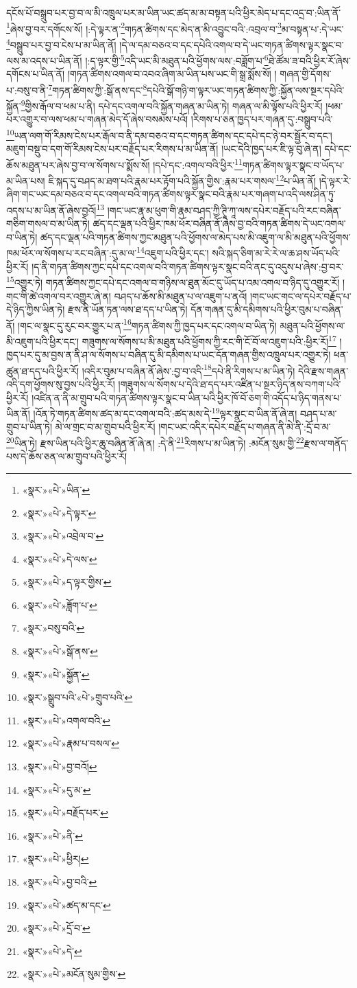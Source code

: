 དངོས་པོ་བསྒྲུབ་པར་བྱ་བ་ལ་མི་འཁྲུལ་པར་མ་ཡིན་ཡང་ཚད་མ་མ་བསྟན་པའི་ཕྱིར་མེད་པ་དང་འདྲ་བ་:ཡིན་ནོ་\footnote{«སྣར་»«པེ་»ཡིན་}ཞེས་བྱ་བར་དགོངས་སོ། །:དེ་ལྟར་ན་\footnote{«སྣར་»«པེ་»དེ་ལྟར་}གཏན་ཚིགས་དང་མེད་ན་མི་འབྱུང་བའི་:འབྲལ་བ་\footnote{«སྣར་»«པེ་»འབྲེལ་བ་}མ་བསྟན་པ་:དེ་ཡང་\footnote{«སྣར་»«པེ་»དེ་ལས་}བསྒྲུབ་པར་བྱ་བ་ངེས་པ་མ་ཡིན་ནོ། །དེ་ལ་དམ་བཅའ་བ་དང་དཔེའི་འགལ་བ་དེ་ཡང་གཏན་ཚིགས་ལྟར་སྣང་བ་ལས་མ་འདས་པ་ཡིན་ནོ། །:ད་ལྟར་གྱི་\footnote{«སྣར་»«པེ་»ད་ལྟར་གྱིས་}འདི་ཡང་མི་མཐུན་པའི་ཕྱོགས་ལས་:བཟློག་པ་\footnote{«སྣར་»«པེ་»ཟློག་པ་}ཐེ་ཚོམ་ཟ་བའི་ཕྱིར་རོ་ཞེས་དགོངས་པ་ཡིན་ནོ། །གཏན་ཚིགས་འགལ་བ་འབའ་ཞིག་མ་ཡིན་པས་ཡང་གི་སྒྲ་སྨོས་སོ། །
གཞན་གྱི་དོགས་པ་:བསུ་བ་ནི་\footnote{«སྣར་»བསུ་བའི་}གཏན་ཚིགས་ཀྱི་:སྒོ་ནས་དང་\footnote{«སྣར་»«པེ་»སྒོ་ནས་}དཔེའི་སྒོ་གཉི་ག་ལྟར་ཡང་གཏན་ཚིགས་ཀྱི་:སྐྱོན་ལས་སྔར་དཔེའི་སྐྱོན་\footnote{«སྣར་»«པེ་»སྐྱོན་}གྱིས་རྒོལ་བ་ཕམ་པ་ནི། དཔེ་དང་འགལ་བའི་སྐྱོན་གཞན་མ་ཡིན་ཏེ། གཞན་ལ་མི་ལྟོས་པའི་ཕྱིར་རོ། །ཕམ་པར་འགྱུར་བ་ལས་ཕམ་པ་གཞན་མེད་དོ་ཞེས་བསམས་པའོ། །རིགས་པ་ཅན་ཁྱད་པར་གཞན་དུ་:བསྒྲུབ་པའི་\footnote{«སྣར་»སྒྲུབ་པའི་«པེ་»གྲུབ་པའི་}ཡན་ལག་གོ་རིམས་ངེས་པར་རྒོལ་བ་ནི་དམ་བཅའ་བ་དང་གཏན་ཚིགས་དང་དཔེ་དང་ཉེ་བར་སྦྱོར་བ་དང་། མཇུག་བསྡུ་བ་དག་གོ་རིམས་ངེས་པར་བརྗོད་པར་རིགས་པ་མ་ཡིན་ནོ། །ཡང་དེའི་ཁྱད་པར་ཇི་ལྟ་བུ་ཞེ་ན། དཔེ་དང་ཆོས་མཐུན་པར་ཞེས་བྱ་བ་ལ་སོགས་པ་སྨོས་སོ། །དཔེ་དང་:འགལ་བའི་ཕྱིར་\footnote{«སྣར་»«པེ་»འགལ་བའི་}གཏན་ཚིགས་ལྟར་སྣང་བ་ཡོད་པ་མ་ཡིན་པས། ཇི་སྐད་དུ་བཤད་མ་ཐག་པའི་རྣམ་པར་རྟོག་པའི་སྐྱོན་གྱིས་:རྣམ་པར་གསལ་\footnote{«སྣར་»«པེ་»རྣམ་པ་བསལ་}པ་ཡིན་ནོ། །དེ་ལྟར་རེ་ཞིག་གང་ཡང་དམ་བཅའ་བ་དང་འགལ་བའི་གཏན་ཚིགས་ལྟར་སྣང་བའི་རྣམ་པར་གཞག་པ་འདི་ལས་ཤིན་ཏུ་འདས་པ་མ་ཡིན་ནོ་ཞེས་བྱའོ།\footnote{«སྣར་»«པེ་»བྱ་བའོ།} །གང་ཡང་རྣ་མ་ཕུག་གི་རྣམ་བཤད་ཀྱི་ཊཱི་ཀཱ་ལས་དཔེར་བརྗོད་པའི་རང་བཞིན་གཅིག་གསལ་བ་མ་ཡིན་ཏེ། ཚད་དང་ལྡན་པའི་ཕྱིར་ཁམ་ཕོར་བཞིན་ནོ་ཞེས་བྱ་བའི་གཏན་ཚིགས་དེ་ཡང་འགལ་བ་ཡིན་ཏེ། ཚད་དང་ལྡན་པའི་གཏན་ཚིགས་ཀྱང་མཐུན་པའི་ཕྱོགས་ལ་མེད་པས་མི་འཇུག་ལ་མི་མཐུན་པའི་ཕྱོགས་ཁམ་ཕོར་ལ་སོགས་པ་རང་བཞིན་:དུ་མ་ལ་\footnote{«སྣར་»«པེ་»དུ་མ་}འཇུག་པའི་ཕྱིར་དང་། སའི་སྐད་ཅིག་མ་རེ་རེ་ལ་ཆ་ཤས་ཡོད་པའི་ཕྱིར་རོ། །ད་ནི་གཏན་ཚིགས་ཀྱང་དཔེ་དང་འགལ་བའི་གཏན་ཚིགས་ལྟར་སྣང་བའི་ནང་དུ་འདུས་པ་ཞེས་:བྱ་བར་\footnote{«སྣར་»«པེ་»བརྗོད་པར་}འགྱུར་ཏེ། གཏན་ཚིགས་ཀྱང་དཔེ་དང་འགལ་བ་གཉིས་ལ་ཐུན་མོང་དུ་ཡོད་པ་འམ་འགལ་བ་ཉིད་དུ་འགྱུར་རོ། །གང་གི་ཚེ་འགལ་བར་འགྱུར་ཞེ་ན། བཤད་པ་ཆོས་མི་མཐུན་པ་ལ་འཇུག་པ་ནའོ། །གང་ཡང་གང་ལ་དཔེར་བརྗོད་པ་དེ་ཉིད་ཀྱིས་ཡིན་ཏེ། རྫས་ནི་ཡོན་ཏན་ལས་ཐ་དད་པ་ཡིན་ཏེ། དོན་གཞན་དུ་མི་དམིགས་པའི་ཕྱིར་བུམ་པ་བཞིན་ནོ། །གང་ལ་སྣང་དུ་རུང་བར་གྱུར་པ་ན་\footnote{«སྣར་»«པེ་»ནི་}གཏན་ཚིགས་ཀྱི་ཁྱད་པར་དང་འགལ་བ་ཡིན་ཏེ། མཐུན་པའི་ཕྱོགས་ལ་མི་འཇུག་པའི་ཕྱིར་དང་། གཟུགས་ལ་སོགས་པ་མི་མཐུན་པའི་ཕྱོགས་ཀྱི་རང་གི་ངོ་བོ་ལ་འཇུག་པའི་:ཕྱིར་རོ།\footnote{«སྣར་»«པེ་»ཕྱིར།} །ཁྱད་པར་དུ་མ་བྱས་ན་ནི་ཤ་ལ་སོགས་པ་བཞིན་དུ་མི་དམིགས་པ་ཡང་དོན་གཞན་གྱིས་འཁྲུལ་པར་འགྱུར་ཏེ། ཕན་ཚུན་ཐ་དད་པའི་ཕྱིར་རོ། །འདིར་བུམ་པ་བཞིན་ནོ་ཞེས་:བྱ་བ་འདི་\footnote{«སྣར་»«པེ་»བྱ་བའི་}དཔེ་ནི་རིགས་པ་མ་ཡིན་ཏེ། དེའི་རྫས་གཞན་འདི་དག་ཕྱོགས་སུ་བྱས་པའི་ཕྱིར་རོ། །གཟུགས་ལ་སོགས་པ་དེའི་ཐ་དད་པར་འཛིན་པ་སྔར་ཉིད་ནས་བཀག་པའི་ཕྱིར་རོ། །འཛིན་ན་ནི་མ་གྲུབ་པའི་གཏན་ཚིགས་ལྟར་སྣང་བ་ཡིན་པའི་ཕྱིར་ཁོ་བོ་ཅག་གི་འདོད་པ་ཉིད་གནས་པ་ཡིན་ནོ། །འོན་ཏེ་གཏན་ཚིགས་ཚད་མ་དང་འགལ་བའི་:ཚད་མས་དེ་\footnote{«སྣར་»«པེ་»ཚད་མ་དང་}ལྟར་སྣང་བ་ཡིན་ནོ་ཞེ་ན། བཤད་པ་མ་གྲུབ་པ་ཡིན་ཏེ། མེ་ལ་གྲང་བ་མ་གྲུབ་པའི་ཕྱིར་རོ། །གང་ཡང་འདིར་དཔེར་བརྗོད་པ་གཞན་ནི་མེ་ནི་:དྲོ་བ་མ་\footnote{«སྣར་»«པེ་»དྲོ་བ་}ཡིན་ཏེ། རྫས་ཡིན་པའི་ཕྱིར་ཆུ་བཞིན་ནོ་ཞེ་ན། :དེ་ནི་\footnote{«སྣར་»«པེ་»དེ་}རིགས་པ་མ་ཡིན་ཏེ། :མངོན་སུམ་གྱི་\footnote{«སྣར་»«པེ་»མངོན་སུམ་གྱིས་}རྫས་ལ་གནོད་པས་དེ་ཆོས་ཅན་ལ་མ་གྲུབ་པའི་ཕྱིར་རོ། 